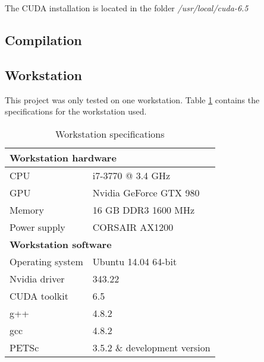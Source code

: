 The CUDA installation is located in the folder \emph{/usr/local/cuda-6.5}

\subsection{Compilation}

\subsection{Workstation}

This project was only tested on one workstation. Table \ref{table:workstation} contains 
the specifications for the workstation used.

\begin{table}[h]
	\begin{center}
	\bgroup
	\def\arraystretch{1.2}
	\begin{tabular}{|l|l|}
		\hline
		\multicolumn{2}{|l|}{\textbf{Workstation hardware}} \\ \hline
		CPU & i7-3770 @ 3.4 GHz \\ \hline
		GPU & Nvidia GeForce GTX 980 \\ \hline
		Memory & 16 GB DDR3 1600 MHz \\ \hline
		Power supply & CORSAIR AX1200 \\ \hline
		\multicolumn{2}{|l|}{\textbf{Workstation software}} \\ \hline
		Operating system & Ubuntu 14.04 64-bit \\ \hline
		Nvidia driver & 343.22 \\ \hline
		CUDA toolkit & 6.5 \\ \hline
		g++ & 4.8.2 \\ \hline
		gcc & 4.8.2 \\ \hline
		PETSc & 3.5.2 \& development version \\ \hline
	\end{tabular}
	\egroup
	\end{center}
	\caption{Workstation specifications}
	\label{table:workstation}
\end{table}

